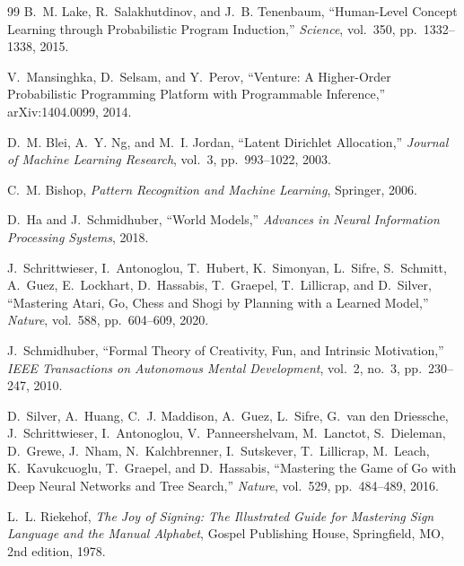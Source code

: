 \documentclass[11pt,a4paper]{article}
\theoremstyle{definition}
\theoremstyle{remark}
\begin{document}
\begin{thebibliography}{99}
B.~M. Lake, R.~Salakhutdinov, and J.~B. Tenenbaum,
\newblock ``Human-Level Concept Learning through Probabilistic Program Induction,''
\newblock \emph{Science}, vol.~350, pp.~1332--1338, 2015.

V.~Mansinghka, D.~Selsam, and Y.~Perov,
\newblock ``Venture: A Higher-Order Probabilistic Programming Platform with Programmable Inference,''
\newblock arXiv:1404.0099, 2014.

D.~M. Blei, A.~Y. Ng, and M.~I. Jordan,
\newblock ``Latent Dirichlet Allocation,''
\newblock \emph{Journal of Machine Learning Research}, vol.~3, pp.~993--1022, 2003.

C.~M. Bishop,
\newblock \emph{Pattern Recognition and Machine Learning},
\newblock Springer, 2006.

D.~Ha and J.~Schmidhuber,
\newblock ``World Models,''
\newblock \emph{Advances in Neural Information Processing Systems}, 2018.

J.~Schrittwieser, I.~Antonoglou, T.~Hubert, K.~Simonyan, L.~Sifre, S.~Schmitt, A.~Guez, E.~Lockhart, D.~Hassabis, T.~Graepel, T.~Lillicrap, and D.~Silver,
\newblock ``Mastering Atari, Go, Chess and Shogi by Planning with a Learned Model,''
\newblock \emph{Nature}, vol.~588, pp.~604--609, 2020.

J.~Schmidhuber,
\newblock ``Formal Theory of Creativity, Fun, and Intrinsic Motivation,''
\newblock \emph{IEEE Transactions on Autonomous Mental Development}, vol.~2, no.~3, pp.~230--247, 2010.

D.~Silver, A.~Huang, C.~J. Maddison, A.~Guez, L.~Sifre, G.~van den Driessche, J.~Schrittwieser, I.~Antonoglou, V.~Panneershelvam, M.~Lanctot, S.~Dieleman, D.~Grewe, J.~Nham, N.~Kalchbrenner, I.~Sutskever, T.~Lillicrap, M.~Leach, K.~Kavukcuoglu, T.~Graepel, and D.~Hassabis,
\newblock ``Mastering the Game of Go with Deep Neural Networks and Tree Search,''
\newblock \emph{Nature}, vol.~529, pp.~484--489, 2016.

L.~L. Riekehof,
\newblock \emph{The Joy of Signing: The Illustrated Guide for Mastering Sign Language and the Manual Alphabet},
\newblock Gospel Publishing House, Springfield, MO, 2nd edition, 1978.

\end{thebibliography}
\end{document}

